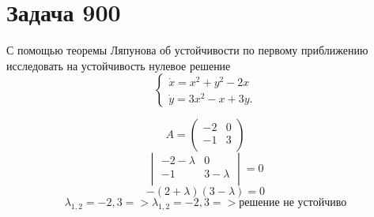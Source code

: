 \section*{Задача 900}
С помощью теоремы Ляпунова об устойчивости по первому приближению исследовать на устойчивость нулевое решение
$$\begin{cases}
      \dot{x} = x^2 + y^2 - 2x \\
      \dot{y} = 3x^2 - x + 3y.
   \end{cases}
$$

\begin{solution}
   $$ A = \begin{pmatrix}
         -2 & 0 \\
         -1 & 3 \\
      \end{pmatrix} $$
   $$\begin{vmatrix}
         -2 - \lambda & 0           \\
         -1           & 3 - \lambda \\
      \end{vmatrix} = 0$$
   $$ -(2 + \lambda)(3 - \lambda) = 0   $$
   $$\lambda_{1, 2} = -2, 3 => \lambda_{1,2} = -2, 3 => \text{решение не устойчиво} $$

\end{solution}

